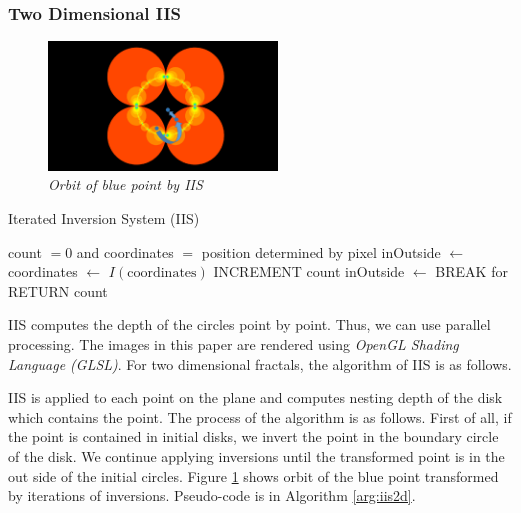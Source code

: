 \subsubsection{Two Dimensional IIS}

\begin{figure}[htbp]
  \center
  \includegraphics[height=1.35in, keepaspectratio]{img/preparation/orbIIS.png}
  \caption{\textit{Orbit of blue point by IIS}}
  \label{fig:iisOrbit}
 \hspace*{\fill}
\end{figure}

 \begin{algorithm}
  \caption{Iterated Inversion System (IIS)}
  \label{arg:iis2d}
  \begin{algorithmic}
   \REQUIRE count $= 0$ and coordinates $=$ position determined by
   pixel
   \STATE inOutside $\leftarrow$ \TRUE
   \STATE coordinates $\leftarrow$ $I(\text{coordinates})$
   \STATE INCREMENT count
   \STATE inOutside $\leftarrow$ \FALSE
   \ENDIF
   \ENDFOR
   \STATE BREAK for
   \ENDIF
   \ENDFOR
   \STATE RETURN count
  \end{algorithmic}
 \end{algorithm}

IIS computes the depth of the circles point by point.
Thus, we can use parallel processing.
The images in this paper are rendered using \textit{OpenGL Shading
Language (GLSL)}.
For two dimensional fractals, the algorithm of IIS is as follows.

IIS is applied to each point on the plane and computes nesting depth of
the disk which contains the point.
The process of the algorithm is as follows.
First of all, if the point is contained in initial disks, we invert the
point in the boundary circle of the disk.
We continue applying inversions until the transformed point is in the
out side of the initial circles.
Figure \ref{fig:iisOrbit} shows orbit of the blue point transformed by
iterations of inversions.
Pseudo-code is in Algorithm \ref{arg:iis2d}.


